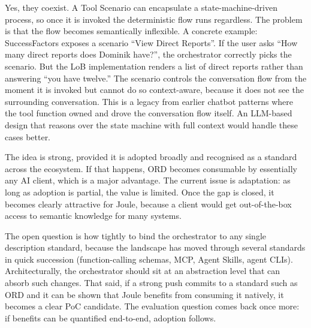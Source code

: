 \medskip{}

Yes, they coexist. A Tool Scenario can encapsulate a state-machine-driven process, so once it is invoked the deterministic flow runs regardless. The problem is that the flow becomes semantically inflexible. A concrete example: SuccessFactors exposes a scenario ``View Direct Reports''. If the user asks ``How many direct reports does Dominik have?'', the orchestrator correctly picks the scenario. But the LoB implementation renders a list of direct reports rather than answering ``you have twelve.'' The scenario controls the conversation flow from the moment it is invoked but cannot do so context-aware, because it does not see the surrounding conversation. This is a legacy from earlier chatbot patterns where the tool function owned and drove the conversation flow itself. An LLM-based design that reasons over the state machine with full context would handle these cases better.

\medskip{}

The idea is strong, provided it is adopted broadly and recognised as a standard across the ecosystem. If that happens, ORD becomes consumable by essentially any AI client, which is a major advantage. The current issue is adaptation: as long as adoption is partial, the value is limited. Once the gap is closed, it becomes clearly attractive for Joule, because a client would get out-of-the-box access to semantic knowledge for many systems.

The open question is how tightly to bind the orchestrator to any single description standard, because the landscape has moved through several standards in quick succession (function-calling schemas, MCP, Agent Skills, agent CLIs). Architecturally, the orchestrator should sit at an abstraction level that can absorb such changes. That said, if a strong push commits to a standard such as ORD and it can be shown that Joule benefits from consuming it natively, it becomes a clear PoC candidate. The evaluation question comes back once more: if benefits can be quantified end-to-end, adoption follows.

\medskip{}

